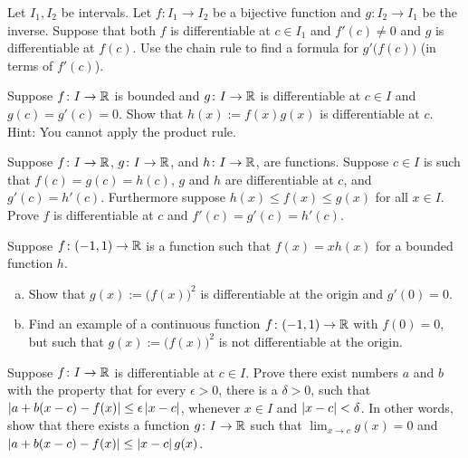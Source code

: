 \begin{exercise}
Let $I_1, I_2$ be intervals.
Let $f \colon I_1 \to I_2$ be a bijective function and $g \colon I_2 \to I_1$
be the inverse.  Suppose that both $f$ is differentiable at $c \in I_1$ and
$f'(c) \not=0$ and $g$ is differentiable at $f(c)$.  Use the chain rule
to find a formula for $g'\bigl(f(c)\bigr)$ (in terms of $f'(c)$).
\end{exercise}

\begin{exercise} \label{exercise:bndmuldiff}
Suppose $f \colon I \to {\mathbb{R}}$ is bounded and $g \colon I \to
{\mathbb{R}}$ is differentiable at $c \in I$ and $g(c) = g'(c) = 0$.  Show
that $h(x) := f(x) g(x)$ is differentiable at $c$.  Hint: You
cannot apply the product rule.
\end{exercise}

\begin{exercise} \label{exercise:diffsqueeze}
Suppose $f \colon I \to {\mathbb{R}}$, 
$g \colon I \to {\mathbb{R}}$, and
$h \colon I \to {\mathbb{R}}$, are functions.  Suppose $c \in I$ is such that
$f(c) = g(c) = h(c)$, $g$ and $h$ are differentiable at $c$,
and $g'(c) = h'(c)$.  Furthermore suppose $h(x) \leq f(x) \leq g(x)$ for
all $x \in I$.  Prove $f$ is differentiable at $c$ and $f'(c) = g'(c) =
h'(c)$.
\end{exercise}

\begin{exercise}
Suppose $f \colon (-1,1) \to {\mathbb{R}}$ is a function such that $f(x) = x h(x)$ for a bounded
function $h$.
\begin{enumerate}[a)]
\item
Show that $g(x) := {\bigl( f(x) \bigr)}^2$ is
differentiable at the origin and $g'(0) = 0$.
\item
Find an example of a
continuous function $f \colon (-1,1) \to {\mathbb{R}}$ with $f(0) = 0$, but such
that $g(x) := {\bigl( f(x) \bigr)}^2$ is not differentiable at the origin.
\end{enumerate}
\end{exercise}

\begin{exercise}
Suppose $f \colon I \to {\mathbb{R}}$ is differentiable at $c \in I$.
Prove there exist numbers $a$ and $b$ with the property that
for every $\epsilon > 0$, there is a $\delta > 0$, such that
$\left\lvert {a+b(x-c) - f(x)} \right\rvert \leq \epsilon \left\lvert {x-c} \right\rvert$, whenever $x \in I$ and
$\left\lvert {x-c} \right\rvert < \delta$.
In other words, show that
there exists a function $g \colon I \to {\mathbb{R}}$
such that $\lim_{x\to c} g(x) = 0$ and
$\left\lvert {a+b(x-c) - f(x)} \right\rvert \leq \left\lvert {x-c} \right\rvert g(x)$.
\end{exercise}

